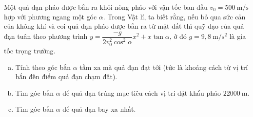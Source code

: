 \begin{bt}%
	Một quả đạn pháo được bắn ra khỏi nòng pháo với vận tốc ban đầu $v_0=500 ~\mathrm{m} / \mathrm{s}$ hợp với phương ngang một góc $\alpha$. Trong Vật lí, ta biết rằng, nếu bỏ qua sức cản của không khí và coi quả đạn pháo được bắn ra từ mặt đất thì quỹ đạo của quả đạn tuân theo phương trình $y=\dfrac{-g}{2 v_0^2 \cos ^2 \alpha} x^2+x \tan \alpha$, ở đó $g=9{,}8 \mathrm{~m} / \mathrm{s}^2$ là gia tốc trọng trường.
	\begin{enumerate}[a)]
		\item Tính theo góc bắn $\alpha$ tầm xa mà quả đạn đạt tới (tức là khoảng cách từ vị trí bắn đến điểm quả đạn chạm đất).
		\item Tìm góc bắn $\alpha$ để quả đạn trúng mục tiêu cách vị trí đặt khẩu pháo $22000 \mathrm{~m}$.
		\item Tìm góc bắn $\alpha$ để quả đạn bay xa nhất.\end{enumerate}
\end{bt}

